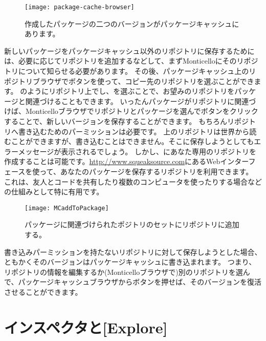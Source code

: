 \documentclass[a4paper,10pt,twoside]{book}
\begin{document}
\begin{figure}[tbp]
\begin{center}
\texttt{[image: package-cache-browser]}
\end{center}
\caption{作成したパッケージの二つのバージョンがパッケージキャッシュにあります。}
\end{figure}

新しいパッケージをパッケージキャッシュ以外のリポジトリに保存するためには、必要に応じてリポジトリを追加するなどして、まずMonticelloにそのリポジトリについて知らせる必要があります。
その後、パッケージキャッシュ上のリポジトリブラウザでボタンを使って、コピー先のリポジトリを選ぶことができます。
のようにリポジトリ上で\actclick し、を選ぶことで、お望みのリポジトリをパッケージと関連づけることもできます。
いったんパッケージがリポジトリに関連づけば、Monticelloブラウザでリポジトリとパッケージを選んでボタンをクリックすることで、新しいバージョンを保存することができます。
もちろんリポジトリへ書き込むためのパーミッションは必要です。
\emphind{\sqsrc}上のリポジトリは世界から読むことができますが、書き込むことはできません。そこに保存しようとしてもエラーメッセージが表示されるでしょう。
しかし、\sqsrc にあなた専用のリポジトリを作成することは可能です。\url{http://www.squeaksource.com}にあるWebインターフェースを使って、あなたのパッケージを保存するリポジトリを利用できます。
これは、友人とコードを共有したり複数のコンピュータを使ったりする場合などの仕組みとして特に有用です。

\begin{figure}[tbp]
\begin{center}
\texttt{[image: MCaddToPackage]}
\end{center}
\caption{パッケージに関連づけられたポジトリのセットにリポジトリに追加する。}
\end{figure}

書き込みパーミッションを持たないリポジトリに対して保存しようとした場合、ともかくそのバージョンはパッケージキャッシュに書き込まれます。
つまり、リポジトリの情報を編集するか(Monticelloブラウザで\actclick )別のリポジトリを選んで、パッケージキャッシュブラウザからボタンを押せば、そのバージョンを復活させることができます。

\section{インスペクタと[Explore]}
\end{document}

